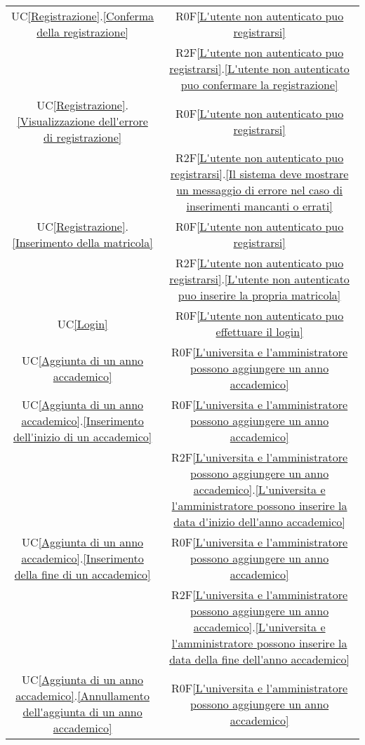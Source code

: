 \begin{longtable}{|c|c|}
\hline
UC\ref{Registrazione}.\ref{Conferma della registrazione} & R0F\ref{L'utente non autenticato puo registrarsi}\\
& R2F\ref{L'utente non autenticato puo registrarsi}.\ref{L'utente non autenticato puo confermare la registrazione}\\
\hline
UC\ref{Registrazione}.\ref{Visualizzazione dell'errore di registrazione} & R0F\ref{L'utente non autenticato puo registrarsi}\\
& R2F\ref{L'utente non autenticato puo registrarsi}.\ref{Il sistema deve mostrare un messaggio di errore nel caso di inserimenti mancanti o errati}\\
\hline
UC\ref{Registrazione}.\ref{Inserimento della matricola} & R0F\ref{L'utente non autenticato puo registrarsi}\\
& R2F\ref{L'utente non autenticato puo registrarsi}.\ref{L'utente non autenticato puo inserire la propria matricola}\\
\hline
UC\ref{Login} & R0F\ref{L'utente non autenticato puo effettuare il login}\\
\hline
UC\ref{Aggiunta di un anno accademico} & R0F\ref{L'universita e l'amministratore possono aggiungere un anno accademico}\\
\hline
UC\ref{Aggiunta di un anno accademico}.\ref{Inserimento dell'inizio di un accademico} & R0F\ref{L'universita e l'amministratore possono aggiungere un anno accademico}\\
& R2F\ref{L'universita e l'amministratore possono aggiungere un anno accademico}.\ref{L'universita e l'amministratore possono inserire la data d'inizio dell'anno accademico}\\
\hline
UC\ref{Aggiunta di un anno accademico}.\ref{Inserimento della fine di un accademico} & R0F\ref{L'universita e l'amministratore possono aggiungere un anno accademico}\\
& R2F\ref{L'universita e l'amministratore possono aggiungere un anno accademico}.\ref{L'universita e l'amministratore possono inserire la data della fine dell'anno accademico}\\
\hline
UC\ref{Aggiunta di un anno accademico}.\ref{Annullamento dell'aggiunta di un anno accademico} & R0F\ref{L'universita e l'amministratore possono aggiungere un anno accademico}\\

\end{longtable}
